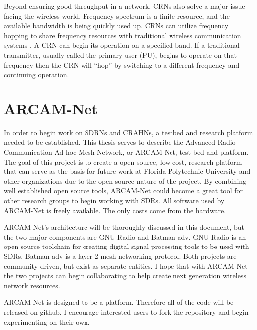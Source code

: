 Beyond ensuring good throughput in a network, CRNs also solve a major issue facing the wireless world. Frequency spectrum is a finite resource, and the available bandwidth is being quickly used up. CRNs can utilize frequency hopping to share frequency resources with traditional wireless communication systems  \cite{6892537}. A CRN can begin its operation on a specified band. If a traditional transmitter, usually called the primary user (PU), begins to operate on that frequency then the CRN will ``hop'' by switching to a different frequency and continuing operation. 


\section{ARCAM-Net}

In order to begin work on SDRNs and CRAHNs, a testbed and research platform needed to be established. This thesis serves to describe the Advanced Radio Communication Ad-hoc Mesh Network, or ARCAM-Net, test bed and platform. The goal of this project is to create a open source, low cost, research platform that can serve as the basis for future work at Florida Polytechnic University and other organizations due to the open source nature of the project. By combining well established open source tools, ARCAM-Net could become a great tool for other research groups to begin working with SDRs. All software used by ARCAM-Net is freely available. The only costs come from the hardware. 

ARCAM-Net's architecture will be thoroughly discussed in this document, but the two major components are GNU Radio and Batman-adv. GNU Radio is an open source toolchain for creating digital signal processing tools to be used with SDRs. Batman-adv is a layer 2 mesh networking protocol. Both projects are community driven, but exist as separate entities. I hope that with ARCAM-Net the two projects can begin collaborating to help create next generation wireless network resources. 

ARCAM-Net is designed to be a platform. Therefore all of the code will be released on github. I encourage interested users to fork the repository and begin experimenting on their own. 

